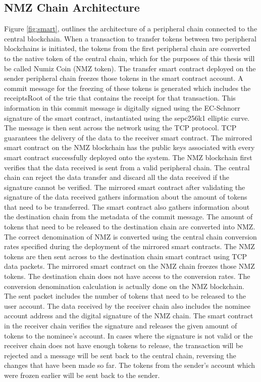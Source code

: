 \documentclass[a4paper,twoside,phd]{BYUPhys}
\begin{document}
\subsection{NMZ Chain Architecture}
Figure \ref{fig:smart}, outlines the architecture of a peripheral chain connected to the central blockchain. When a transaction to transfer tokens between two peripheral blockchains is initiated, the tokens from the first peripheral chain are converted to the native token of the central chain, which for the purposes of this thesis will be called Numiz Coin (NMZ token). The transfer smart contract deployed on the sender peripheral chain freezes those tokens in the smart contract account. A commit message for the freezing of these tokens is generated which includes the receiptsRoot of the trie that contains the receipt for that transaction. This information in this commit message is digitally signed using the EC-Schnorr signature of the smart contract, instantiated using the sepc256k1 elliptic curve. The message is then sent across the network using the TCP protocol. TCP guarantees the delivery of the data to the receiver smart contract. The mirrored smart contract on the NMZ blockchain has the public keys associated with every smart contract successfully deployed onto the system. The NMZ blockchain first verifies that the data received is sent from a valid peripheral chain. The central chain can reject the data transfer and discard all the data received if the signature cannot be verified. The mirrored smart contract after validating the signature of the data received gathers information about the amount of tokens that need to be transferred. The smart contract also gathers information about the destination chain from the metadata of the commit message. The amount of tokens that need to be released to the destination chain are converted into NMZ. The correct denomination of NMZ is converted using the central chain conversion rates specified during the deployment of the mirrored smart contracts. The NMZ tokens are then sent across to the destination chain smart contract using TCP data packets. The mirrored smart contract on the NMZ chain freezes those NMZ tokens. The destination chain does not have access to the conversion rates. The conversion denomination calculation is actually done on the NMZ blockchain. The sent packet includes the number of tokens that need to be released to the user account. The data received by the receiver chain also includes the nominee account address and the digital signature of the NMZ chain. The smart contract in the receiver chain verifies the signature and releases the given amount of tokens to the nominee's account. In cases where the signature is not valid or the receiver chain does not have enough tokens to release, the transaction will be rejected and a message will be sent back to the central chain, reversing the changes that have been made so far. The tokens from the sender's account which were frozen earlier will be sent back to the sender.
\end{document}
